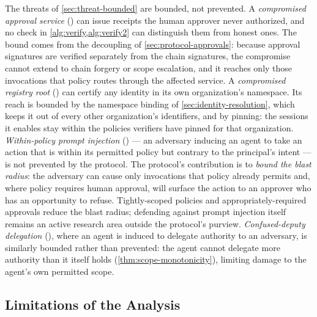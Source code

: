 \documentclass[11pt,a4paper]{article}
\begin{document}
The threats of \cref{sec:threat-bounded} are bounded, not prevented.
A \emph{compromised approval service} () can issue
receipts the human approver never authorized, and no check in
\cref{alg:verify,alg:verify2} can distinguish them from honest ones. The bound comes
from the decoupling of \cref{sec:protocol-approvals}: because approval
signatures are verified separately from the chain signatures, the
compromise cannot extend to chain forgery or scope escalation, and it
reaches only those invocations that policy routes through the affected
service. A \emph{compromised registry root} () can
certify any identity in its own organization's namespace. Its reach is
bounded by the namespace binding of \cref{sec:identity-resolution}, which
keeps it out of every other organization's identifiers, and by pinning:
the sessions it enables stay within the policies verifiers have pinned
for that organization. \emph{Within-policy prompt injection} () --- an adversary
inducing an agent to take an action that is within its permitted policy
but contrary to the principal's intent --- is not prevented by the
protocol. The protocol's contribution is to \emph{bound the blast
radius}: the adversary can cause only invocations that policy already
permits and, where policy requires human approval, will surface the
action to an approver who has an opportunity to refuse. Tightly-scoped
policies and appropriately-required approvals reduce the blast radius;
defending against prompt injection itself remains an active research
area outside the protocol's purview. \emph{Confused-deputy delegation}
(), where an agent is induced to delegate authority to an
adversary, is similarly bounded rather than prevented: the agent cannot
delegate more authority than it itself holds
(\cref{thm:scope-monotonicity}), limiting damage to the agent's own
permitted scope.

\subsection{Limitations of the Analysis}
\label{sec:security-limitations-analysis}
\end{document}
